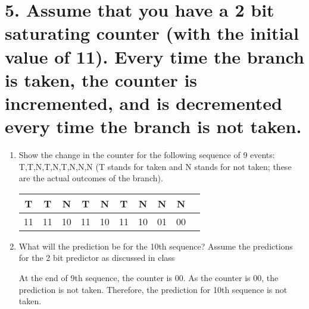 \documentclass[11pt]{article}
\newenvironment{qparts}{\begin{enumerate}[{(}a{)}]}{\end{enumerate}}
\begin{document}
\newpage

\section*{5. Assume that you have a 2 bit saturating counter (with the initial value of 11). Every time the branch is taken, the counter is incremented, and is decremented every time the branch is not taken.}
\begin{qparts}
    \item Show the change in the counter for the following sequence of 9 events: T,T,N,T,N,T,N,N,N  (T stands for taken and N stands for not taken; these are the actual outcomes of the branch).
    
    \begin{tabular}{|c|c|c|c|c|c|c|c|c|c|}
    \hline
    T & T & N & T & N & T & N & N & N \\
    \hline
    11 & 11 & 10 & 11 & 10 & 11 & 10 & 01 & 00 \\
    \hline
    \end{tabular}

    \item What will the prediction be for the 10th sequence? Assume the predictions for the 2 bit predictor as discussed in class 
    
    At the end of 9th sequence, the counter is 00. As the counter is 00, the prediction is not taken. Therefore, the prediction for 10th sequence is not taken.
\end{qparts}
\end{document}
